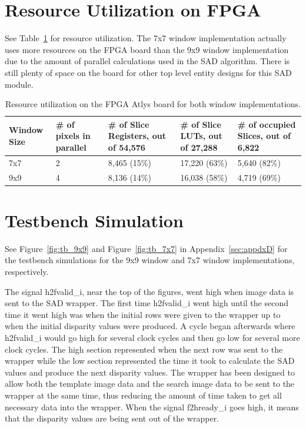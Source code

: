 \section{Resource Utilization on FPGA}
\label{sec:utilize}

See Table~\ref{table:utilize} for resource utilization. The 7x7 window implementation actually uses more resources on the FPGA board than the 9x9 window implementation due to the amount of parallel calculations used in the SAD algorithm. There is still plenty of space on the board for other top level entity designs for this SAD module.

\begin{table}
\begin{center}
	\begin{tabular}{| p{2cm} | p{2cm} | p{2.5cm} | p{3cm} | p{2.5cm} |}
		\hline
		\rowstyle{\bfseries} Window Size & 
		\rowstyle{\bfseries} \# of pixels in parallel & 
		\rowstyle{\bfseries} \# of Slice Registers, out of 54,576 &
		\rowstyle{\bfseries} \# of Slice LUTs, out of 27,288 & 
		\rowstyle{\bfseries} \# of occupied Slices, out of 6,822 %
		\tabularnewline
		\hline
		7x7 & 2 & 8,465 (15\%) & 17,220 (63\%) & 5,640 (82\%) %
		\tabularnewline
		\hline 
		9x9 & 4 & 8,136 (14\%) & 16,038 (58\%) & 4,719 (69\%) %
		\tabularnewline
		\hline 
	\end{tabular}
	\captionfonts
	\caption{Resource utilization on the FPGA Atlys board for both window implementations.}
	\label{table:utilize}
\end{center}
\end{table}

\section{Testbench Simulation}
\label{sec:testbench}

See Figure~\ref{fig:tb_9x9} and Figure~\ref{fig:tb_7x7} in Appendix~\ref{sec:appdxD} for the testbench simulations for the 9x9 window and 7x7 window implementations, respectively.

The signal h2fvalid\_i, near the top of the figures, went high when image data is sent to the SAD wrapper. The first time h2fvalid\_i went high until the second time it went high was when the initial rows were given to the wrapper up to when the initial disparity values were produced. A cycle began afterwards where h2fvalid\_i would go high for several clock cycles and then go low for several more clock cycles. The high section represented when the next row was sent to the wrapper while the low section represented the time it took to calculate the SAD values and produce the next disparity values. The wrapper has been designed to allow both the template image data and the search image data to be sent to the wrapper at the same time, thus reducing the amount of time taken to get all necessary data into the wrapper. When the signal f2hready\_i goes high, it means that the disparity values are being sent out of the wrapper.

